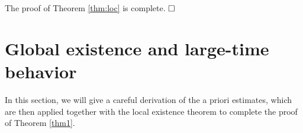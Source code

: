 \documentclass[a4paper,oneside,11pt]{article}
\numberwithin{equation}{section}
\begin{document}
%
%
The proof of Theorem \ref{thm:loc} is complete. $\hfill\square$


\section{Global existence and large-time behavior}\label{sec3}
\indent\qquad
In this section, we will give a careful derivation of the a priori estimates, which are then applied together with the local existence theorem to complete the proof of Theorem \ref{thm1}.
\end{document}
